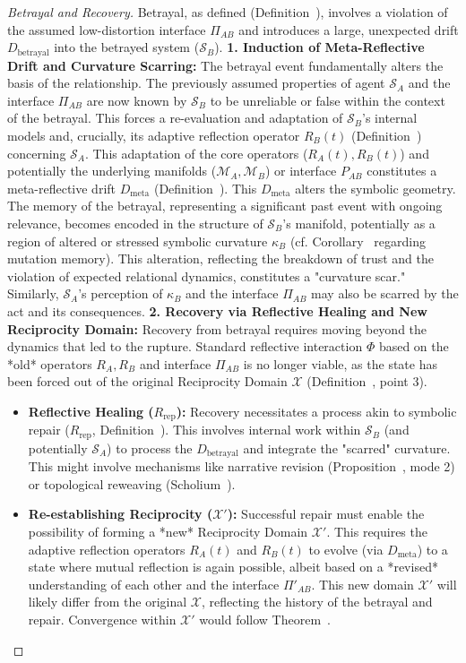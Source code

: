 \begin{proof}[Betrayal and Recovery]
\label{proof:bk9_betrayal_and_recovery}
Betrayal, as defined (Definition~), involves a violation of the assumed low-distortion interface $\Pi_{AB}$ and introduces a large, unexpected drift $D_{\text{betrayal}}$ into the betrayed system ($\mathcal{S}_B$).
\textbf{1. Induction of Meta-Reflective Drift and Curvature Scarring:}
The betrayal event fundamentally alters the basis of the relationship. The previously assumed properties of agent $\mathcal{S}_A$ and the interface $\Pi_{AB}$ are now known by $\mathcal{S}_B$ to be unreliable or false within the context of the betrayal. This forces a re-evaluation and adaptation of $\mathcal{S}_B$'s internal models and, crucially, its adaptive reflection operator $R_B(t)$ (Definition~) concerning $\mathcal{S}_A$. This adaptation of the core operators ($R_A(t), R_B(t)$) and potentially the underlying manifolds ($\mathcal{M}_A, \mathcal{M}_B$) or interface $P_{AB}$ constitutes a meta-reflective drift $D_{\text{meta}}$ (Definition~).
This $D_{\text{meta}}$ alters the symbolic geometry. The memory of the betrayal, representing a significant past event with ongoing relevance, becomes encoded in the structure of $\mathcal{S}_B$'s manifold, potentially as a region of altered or stressed symbolic curvature $\kappa_B$ (cf. Corollary~ regarding mutation memory). This alteration, reflecting the breakdown of trust and the violation of expected relational dynamics, constitutes a "curvature scar." Similarly, $\mathcal{S}_A$'s perception of $\kappa_B$ and the interface $\Pi_{AB}$ may also be scarred by the act and its consequences.
\textbf{2. Recovery via Reflective Healing and New Reciprocity Domain:}
Recovery from betrayal requires moving beyond the dynamics that led to the rupture. Standard reflective interaction $\Phi$ based on the *old* operators $R_A, R_B$ and interface $\Pi_{AB}$ is no longer viable, as the state has been forced out of the original Reciprocity Domain $\mathcal{X}$ (Definition~, point 3).
\begin{itemize}
    \item \textbf{Reflective Healing ($R_{\text{rep}}$):} Recovery necessitates a process akin to symbolic repair ($R_{\text{rep}}$, Definition~). This involves internal work within $\mathcal{S}_B$ (and potentially $\mathcal{S}_A$) to process the $D_{\text{betrayal}}$ and integrate the "scarred" curvature. This might involve mechanisms like narrative revision (Proposition~, mode 2) or topological reweaving (Scholium~).
    \item \textbf{Re-establishing Reciprocity ($\mathcal{X}'$):} Successful repair must enable the possibility of forming a *new* Reciprocity Domain $\mathcal{X}'$. This requires the adaptive reflection operators $R_A(t)$ and $R_B(t)$ to evolve (via $D_{\text{meta}}$) to a state where mutual reflection is again possible, albeit based on a *revised* understanding of each other and the interface $\Pi'_{AB}$. This new domain $\mathcal{X}'$ will likely differ from the original $\mathcal{X}$, reflecting the history of the betrayal and repair. Convergence within $\mathcal{X}'$ would follow Theorem~.

\end{itemize}
\end{proof}
